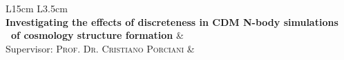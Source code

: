 \begin{table}[h]
  \begin{tabular}{L{15cm} L{3.5cm}}
     \\

    \textbf{Investigating the effects of discreteness in CDM N-body simulations \
    of cosmology structure formation} &  \\
    Supervisor: \textsc{Prof. Dr. Cristiano Porciani} & \\

  \end{tabular}
\end{table}